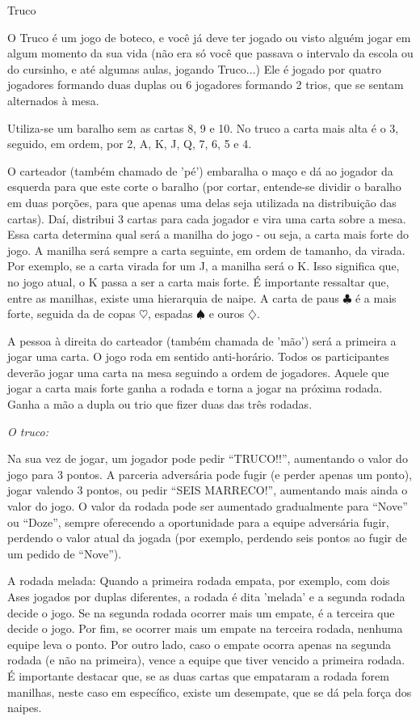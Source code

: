 \begin{subsecao}{Truco}

O Truco é um jogo de boteco, e você já deve ter jogado ou visto alguém jogar em
algum momento da sua vida (não era só você que passava o intervalo da escola ou
do cursinho, e até algumas aulas, jogando Truco...) Ele é jogado por quatro
jogadores formando duas duplas ou 6 jogadores formando 2 trios, que se sentam
alternados à mesa.

Utiliza-se um baralho sem as cartas 8, 9 e 10. No truco a carta mais alta é o 3,
seguido, em ordem, por 2, A, K, J, Q, 7, 6, 5 e 4. 

O carteador (também chamado de 'pé') embaralha o maço e dá ao jogador da
esquerda para que este corte o baralho (por cortar, entende-se dividir o baralho
em duas porções, para que apenas uma delas seja utilizada na distribuição das
cartas). Daí, distribui 3 cartas para cada
jogador e vira uma carta sobre a mesa. Essa carta determina qual será a manilha
do jogo - ou seja, a carta mais forte do jogo. A manilha será sempre a carta
seguinte, em ordem de tamanho, da virada. Por exemplo, se a carta virada for um J,
a manilha será o K. Isso significa que, no jogo atual, o
K passa a ser a carta mais forte. É importante ressaltar que,
entre as manilhas, existe uma hierarquia de naipe. A carta de paus $\clubsuit$ é
a mais forte, seguida da de copas $\heartsuit$, espadas $\spadesuit$ e ouros
$\diamondsuit$.

A pessoa à direita do carteador (também chamada de 'mão') será a primeira a
jogar uma carta. O jogo roda em sentido anti-horário. Todos os participantes
deverão jogar uma carta na mesa seguindo a ordem de jogadores. Aquele que jogar
a carta mais forte ganha a rodada e torna a jogar na próxima rodada. Ganha a
mão a dupla ou trio que fizer duas das três rodadas.

\textit{O truco:}

Na sua vez de jogar, um jogador pode pedir ``TRUCO!!'', aumentando o valor do
jogo para 3 pontos. A parceria adversária pode fugir (e perder apenas um
ponto), jogar valendo 3 pontos, ou pedir ``SEIS MARRECO!'', aumentando mais ainda
o valor do jogo. O valor da rodada pode ser aumentado gradualmente para ``Nove''
ou ``Doze'', sempre oferecendo a oportunidade para a equipe adversária fugir,
perdendo o valor atual da jogada (por exemplo, perdendo seis pontos ao fugir de
um pedido de ``Nove''). 

A rodada melada: Quando a primeira rodada empata, por exemplo, com dois Ases
jogados por duplas diferentes, a rodada é dita 'melada' e a segunda rodada
decide o jogo. Se na segunda rodada ocorrer mais um empate, é a terceira que decide
o jogo. Por fim, se ocorrer mais um empate na terceira rodada, nenhuma equipe leva
o ponto. Por outro lado, caso o empate ocorra apenas na segunda rodada (e não na
primeira), vence a equipe que tiver vencido a primeira rodada. É importante destacar
que, se as duas cartas que empataram a rodada forem manilhas, neste caso em
específico, existe um desempate, que se dá pela força dos naipes. 


\end{subsecao}
